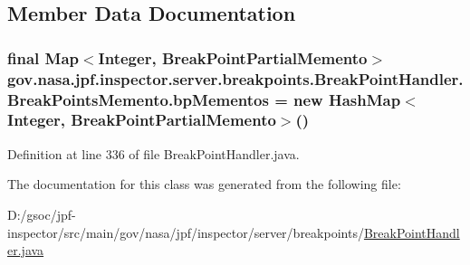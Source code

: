 \subsection{Member Data Documentation}
\subsubsection[{\texorpdfstring{bp\+Mementos}{bpMementos}}]{\setlength{\rightskip}{0pt plus 5cm}final Map$<$Integer, {\bf Break\+Point\+Partial\+Memento}$>$ gov.\+nasa.\+jpf.\+inspector.\+server.\+breakpoints.\+Break\+Point\+Handler.\+Break\+Points\+Memento.\+bp\+Mementos = new Hash\+Map$<$Integer, {\bf Break\+Point\+Partial\+Memento}$>$()\hspace{0.3cm}{\ttfamily [private]}}\hypertarget{classgov_1_1nasa_1_1jpf_1_1inspector_1_1server_1_1breakpoints_1_1_break_point_handler_1_1_break_points_memento_a2d6ba75868019239ae2cc84828be7950}{}\label{classgov_1_1nasa_1_1jpf_1_1inspector_1_1server_1_1breakpoints_1_1_break_point_handler_1_1_break_points_memento_a2d6ba75868019239ae2cc84828be7950}


Definition at line 336 of file Break\+Point\+Handler.\+java.



The documentation for this class was generated from the following file\+:\begin{DoxyCompactItemize}
\item 
D\+:/gsoc/jpf-\/inspector/src/main/gov/nasa/jpf/inspector/server/breakpoints/\hyperlink{_break_point_handler_8java}{Break\+Point\+Handler.\+java}\end{DoxyCompactItemize}
